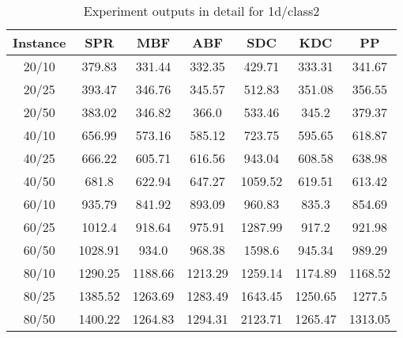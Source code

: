 \begin{table}[ht!]
    \caption{Experiment outputs in detail for 1d/class2}
    \centering
    \begin{tabular}{@{}ccccccc@{}}
        \toprule
        {\bfseries Instance} & {\bfseries SPR} & {\bfseries MBF}
        & {\bfseries ABF} & {\bfseries SDC} & {\bfseries KDC} & {\bfseries PP}\\
        \midrule
        20/10 & 379.83 & 331.44 & 332.35 & 429.71 & 333.31 & 341.67\\
        20/25 & 393.47 & 346.76 & 345.57 & 512.83 & 351.08 & 356.55\\
        20/50 & 383.02 & 346.82 & 366.0 & 533.46 & 345.2 & 379.37\\
        40/10 & 656.99 & 573.16 & 585.12 & 723.75 & 595.65 & 618.87\\
        40/25 & 666.22 & 605.71 & 616.56 & 943.04 & 608.58 & 638.98\\
        40/50 & 681.8 & 622.94 & 647.27 & 1059.52 & 619.51 & 613.42\\
        60/10 & 935.79 & 841.92 & 893.09 & 960.83 & 835.3 & 854.69\\
        60/25 & 1012.4 & 918.64 & 975.91 & 1287.99 & 917.2 & 921.98\\
        60/50 & 1028.91 & 934.0 & 968.38 & 1598.6 & 945.34 & 989.29\\
        80/10 & 1290.25 & 1188.66 & 1213.29 & 1259.14 & 1174.89 & 1168.52\\
        80/25 & 1385.52 & 1263.69 & 1283.49 & 1643.45 & 1250.65 & 1277.5\\
        80/50 & 1400.22 & 1264.83 & 1294.31 & 2123.71 & 1265.47 & 1313.05\\
        \bottomrule
    \end{tabular}
\end{table}
